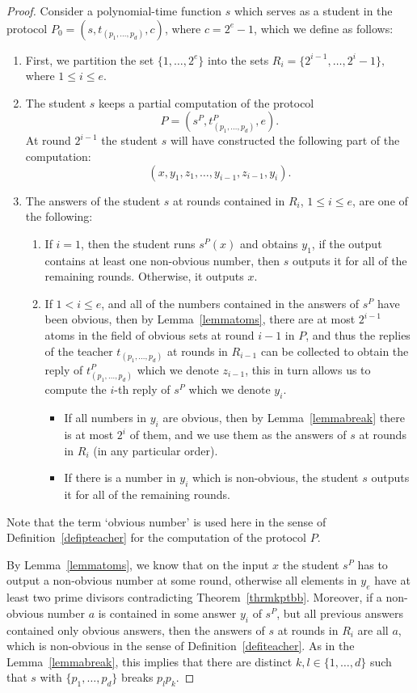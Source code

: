 \documentclass{lmcs}
\begin{document}
\begin{proof}
    Consider a polynomial-time function $s$ which serves as a student in the protocol $P_0 =(s,t_{(p_1,\dots,p_d)},c)$, where $c=2^{{e}}-1$, which we define as follows: 
    \begin{enumerate}
        \item First, we partition the set $\{1,\dots,2^{{e}}\}$ into the sets $R_i = \{2^{i-1},\dots , 2^{i}-1\},$ where $1\leq i \leq {e}$.
        \item The student $s$ keeps a partial computation of the protocol \[P=(s^P,t^P_{(p_1,\dots,p_d)},{e}).\] At round $2^{i-1}$ the student $s$ will have constructed the following part of the computation:
        \[(x,y_1,z_1,\dots,y_{i-1},z_{i-1},y_i).\]
        \item The answers of the student $s$ at rounds contained in $R_i$, $1\leq i \leq {e}$, are one of the following:
        \begin{enumerate}
            \item If $i=1$, then the student runs $s^P(x)$ and obtains $y_1$, if the output contains at least one non-obvious number, then $s$ outputs it for all of the remaining rounds. Otherwise, it outputs $x$.
            \item If $1<i\leq {e}$, and all of the numbers contained in the answers of $s^P$ have been obvious, then by Lemma~\ref{lemmatoms}, there are at most $2^{i-1}$ atoms in the field of obvious sets at round $i-1$ in $P$, and thus the replies of the teacher $t_{(p_1,\dots,p_d)}$ at rounds in $R_{i-1}$ can be collected to obtain the reply of $t^P_{(p_1,\dots,p_d)}$ which we denote $z_{i-1}$, this in turn allows us to compute the $i$-th reply of $s^P$ which we denote $y_i$. 
            \begin{itemize}
                \item If all numbers in $y_i$ are obvious, then by Lemma~\ref{lemmabreak} there is at most $2^i$ of them, and we use them as the answers of $s$ at rounds in $R_i$ (in any particular order).
                \item If there is a number in $y_i$ which is non-obvious, the student $s$ outputs it for all of the remaining rounds.
            \end{itemize} 
        \end{enumerate}
    \end{enumerate}
    Note that the term `obvious number' is used here in the sense of Definition~\ref{defipteacher} for the computation of the protocol $P$.

    By Lemma~\ref{lemmatoms}, we know that on the input $x$ the student $s^P$ has to output a non-obvious number at some round, otherwise all elements in $y_{{e}}$ have at least two prime divisors contradicting Theorem~\ref{thrmkptbb}. Moreover, if a non-obvious number $a$ is contained in some answer $y_i$ of $s^P$, but all previous answers contained only obvious answers, then the answers of $s$ at rounds in $R_i$ are all $a$, which is non-obvious in the sense of Definition~\ref{defiteacher}. As in the Lemma~\ref{lemmabreak}, this implies that there are distinct $k,l\in \{1,\dots,d\}$ such that $s$ with $\{p_1,\dots,p_d\}$ breaks $p_lp_k$.
\end{proof}
\end{document}
